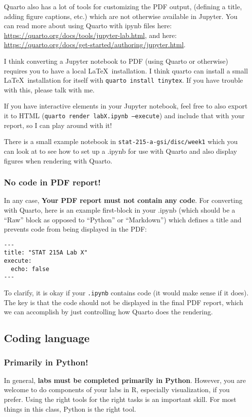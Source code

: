 \documentclass[letterpaper,12pt]{article}
\begin{document}
Quarto also has a lot of tools for customizing the PDF output, (defining a title, adding figure captions, etc.) which are not otherwise available in Jupyter. You can read more about using Quarto with ipynb files here: \url{https://quarto.org/docs/tools/jupyter-lab.html}, and here: \url{https://quarto.org/docs/get-started/authoring/jupyter.html}.

I think converting a Jupyter notebook to PDF (using Quarto or otherwise) requires you to have a local \LaTeX\ installation. I think quarto can install a small \LaTeX\ installation for itself with \texttt{quarto install tinytex}. If you have trouble with this, please talk with me.

If you have interactive elements in your Jupyter notebook, feel free to also export it to HTML (\texttt{quarto render labX.ipynb --execute}) and include that with your report, so I can play around with it!

There is a small example notebook in \texttt{stat-215-a-gsi/disc/week1} which you can look at to see how to set up a .ipynb for use with Quarto and also display figures when rendering with Quarto.

\subsubsection{No code in PDF report!}
In any case, \textbf{Your PDF report must not contain any code}. For converting with Quarto, here is an example first-block in your .ipynb (which should be a ``Raw'' block as opposed to ``Python'' or ``Markdown'') which defines a title and prevents code from being displayed in the PDF:
\begin{verbatim}
---
title: "STAT 215A Lab X"
execute:
  echo: false
---
\end{verbatim}
To clarify, it is okay if your \texttt{.ipynb} contains code (it would make sense if it does). The key is that the code should not be displayed in the final PDF report, which we can accomplish by just controlling how Quarto does the rendering.

\subsection{Coding language}
\subsubsection{Primarily in Python!}
In general, \textbf{labs must be completed primarily in Python}. However, you are welcome to do components of your labs in R, especially visualization, if you prefer. Using the right tools for the right tasks is an important skill. For most things in this class, Python is the right tool.
\end{document}
